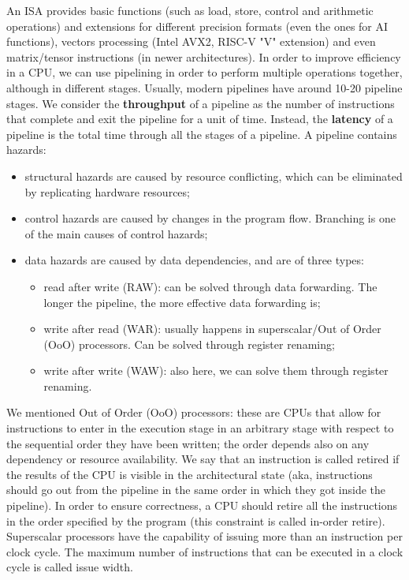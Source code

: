 An ISA provides basic functions (such as load, store, control and arithmetic operations) and extensions for different precision formats (even the ones for AI functions), vectors processing (Intel AVX2, RISC-V "V" extension) and even matrix/tensor instructions (in newer architectures).
\nwl
In order to improve efficiency in a CPU, we can use pipelining in order to perform multiple operations together, although in different stages. Usually, modern pipelines have around 10-20 pipeline stages.
\nwl
We consider the \textbf{throughput} of a pipeline as the number of instructions that complete and exit the pipeline for a unit of time. Instead, the \textbf{latency} of a pipeline is the total time through all the stages of a pipeline.
\nwl
A pipeline contains hazards:
\begin{itemize}
    \item structural hazards are caused by resource conflicting, which can be eliminated by replicating hardware resources;
    \item control hazards are caused by changes in the program flow. Branching is one of the main causes of control hazards;
    \item data hazards are caused by data dependencies, and are of three types:
    \begin{itemize}
        \item read after write (RAW): can be solved through data forwarding. The longer the pipeline, the more effective data forwarding is;
        \item write after read (WAR): usually happens in superscalar/Out of Order (OoO) processors. Can be solved through register renaming;
        \item write after write (WAW): also here, we can solve them through register renaming.
    \end{itemize}
\end{itemize} 

We mentioned Out of Order (OoO) processors: these are CPUs that allow for instructions to enter in the execution stage in an arbitrary stage with respect to the sequential order they have been written; the order depends also on any dependency or resource availability. We say that an instruction is called retired if the results of the CPU is visible in the architectural state (aka, instructions should go out from the pipeline in the same order in which they got inside the pipeline). In order to ensure correctness, a CPU should retire all the instructions in the order specified by the program (this constraint is called in-order retire).
\nwl
Superscalar processors have the capability of issuing more than an instruction per clock cycle. The maximum number of instructions that can be executed in a clock cycle is called issue width.
\nwl

